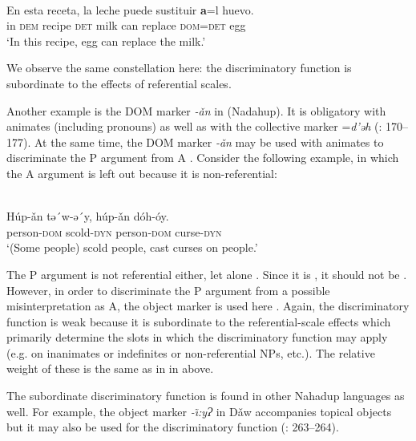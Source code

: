 \documentclass[output=paper]{langsci/langscibook}
\begin{document}
\ea\label{ex:serzant:16}
\\
\gll En esta receta, la   leche   puede   sustituir \textbf{a}=l     huevo.\\
     in  \textsc{dem} recipe \textsc{det}   milk   can   replace \textsc{dom=det}   egg\\
\glt ‘In this recipe, egg can replace the milk.’
\z

We observe the same constellation here: the discriminatory function is subordinate to the effects of referential scales. 

Another example is the DOM marker \textit{{}-ǎn} in  (Nadahup). It is obligatory with  animates (including pronouns) as well as with the  collective marker =\textit{d’ǝh} (\citealt{Epps2008}: 170–177). At the same time, the DOM marker \textit{{}-ǎn} may be used with  animates to discriminate the P argument from A \citep[95]{Epps2009_DOM}. Consider the following example, in which the A argument is left out because it is non-referential: 

\ea\label{ex:serzant:17}
\\
\gll Húp-ǎn   tǝ´w-ǝ´y,   húp-ǎn    dóh-óy.\\
     person-\textsc{dom}  scold-\textsc{dyn}  person-\textsc{dom}  curse-\textsc{dyn}\\
\glt ‘(Some people) scold people, cast curses on people.’
\z

The P argument is not referential either, let alone . Since it is , it should not be . However, in order to discriminate the P argument from a possible misinterpretation as A, the object marker is used here \citep[95]{Epps2009_DOM}. Again, the discriminatory function is weak because it is subordinate to the referential-scale effects which primarily determine the slots in which the discriminatory function may apply (e.g. on inanimates or indefinites or non-referential NPs, etc.). The relative weight of these is the same as in  in  above. 

The subordinate discriminatory function is found in other Nahadup languages as well. For example, the object marker \textit{{}-\~\i:yɁ} in Dǎw accompanies topical objects but it may also be used for the discriminatory function (\citealt{MartinsMartins1999}: 263–264). 
\end{document}
